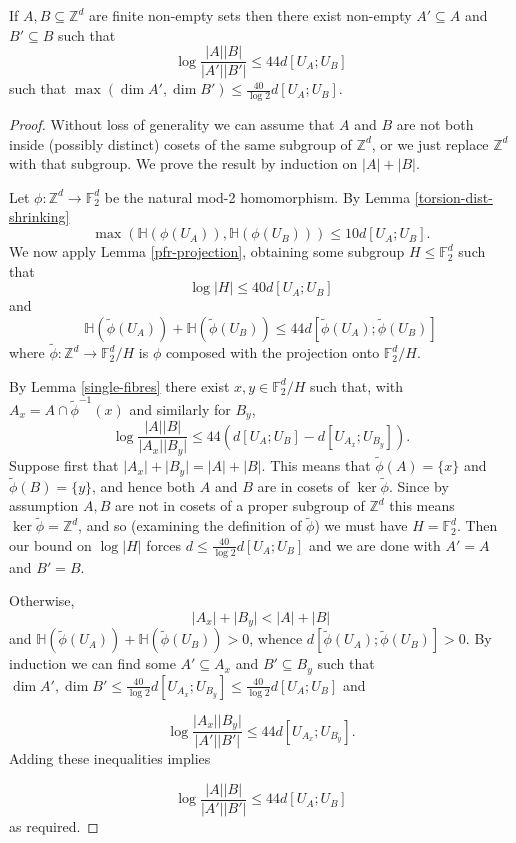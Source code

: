 \begin{theorem}\label{weak-pfr-asymm}\leanok
If $A,B\subseteq \mathbb{Z}^d$ are finite non-empty sets then there exist non-empty $A'\subseteq A$ and $B'\subseteq B$ such that
\[\log\frac{\lvert A\rvert\lvert B\rvert}{\lvert A'\rvert\lvert B'\rvert}\leq 44d[U_A;U_B]\]
such that $\max(\dim A',\dim B')\leq \frac{40}{\log 2} d[U_A;U_B]$.
\end{theorem}
\begin{proof}
Without loss of generality we can assume that $A$ and $B$ are not both inside (possibly distinct) cosets of the same subgroup of $\mathbb{Z}^d$, or we just replace $\mathbb{Z}^d$ with that subgroup. We prove the result by induction on $\lvert A\rvert+\lvert B\rvert$.

Let $\phi:\mathbb{Z}^d\to \mathbb{F}_2^d$ be the natural mod-2 homomorphism. By Lemma \ref{torsion-dist-shrinking}
\[\max(\mathbb{H}(\phi(U_A)),\mathbb{H}(\phi(U_B)))\leq 10d[U_A;U_B].\]
We now apply Lemma \ref{pfr-projection}, obtaining some subgroup $H\leq \mathbb{F}_2^d$ such that
\[\log \lvert H\rvert \leq 40d[U_A;U_B]\]
and
\[\mathbb{H}(\tilde{\phi}(U_A))+\mathbb{H}(\tilde{\phi}(U_B))\leq 44 d[\tilde{\phi}(U_A);\tilde{\phi}(U_B)]\]
where $\tilde{\phi}:\mathbb{Z}^d\to \mathbb{F}_2^d/H$ is $\phi$ composed with the projection onto $\mathbb{F}_2^d/H$.


By Lemma \ref{single-fibres} there exist $x,y\in \mathbb{F}_2^d/H$ such that, with $A_x=A\cap \tilde{\phi}^{-1}(x)$ and similarly for $B_y$,
\[\log \frac{\lvert A\rvert\lvert B\rvert}{\lvert A_x\rvert\lvert B_y\rvert}\leq 44(d[U_A;U_B]-d[U_{A_x};U_{B_y}]).\]
Suppose first that $\lvert A_x\rvert+\lvert B_y\rvert=\lvert A\rvert+\lvert B\rvert$. This means that $\tilde{\phi}(A)=\{x\}$ and $\tilde{\phi}(B)=\{y\}$, and hence both $A$ and $B$ are in cosets of $\ker \tilde{\phi}$. Since by assumption $A,B$ are not in cosets of a proper subgroup of $\mathbb{Z}^d$ this means $\ker\tilde{\phi}=\mathbb{Z}^d$, and so (examining the definition of $\tilde{\phi}$) we must have $H=\mathbb{F}_2^d$. Then our bound on $\log\lvert H\rvert$ forces $d\leq \frac{40}{\log 2}d[U_A;U_B]$ and we are done with $A'=A$ and $B'=B$.

Otherwise,
\[\lvert A_x\rvert+\lvert B_y\rvert <\lvert A\rvert+\lvert B\rvert\]
and $\mathbb{H}(\tilde{\phi}(U_A))+\mathbb{H}(\tilde{\phi}(U_B))>0$, whence $d[\tilde{\phi}(U_A);\tilde{\phi}(U_B)]>0$. By induction we can find some $A'\subseteq A_x$ and $B'\subseteq B_y$ such that $\dim A',\dim B'\leq \frac{40}{\log 2} d[U_{A_x};U_{B_y}]\leq \frac{40}{\log 2}d[U_A;U_B]$ and

\[\log \frac{\lvert A_x\rvert\lvert B_y\rvert}{\lvert A'\rvert\lvert B'\rvert}\leq 44d[U_{A_x};U_{B_y}].\]
Adding these inequalities implies

\[\log\frac{\lvert A\rvert\lvert B\rvert}{\lvert A'\rvert\lvert B'\rvert}\leq 44d[U_A;U_B]\]
as required.
\end{proof}

